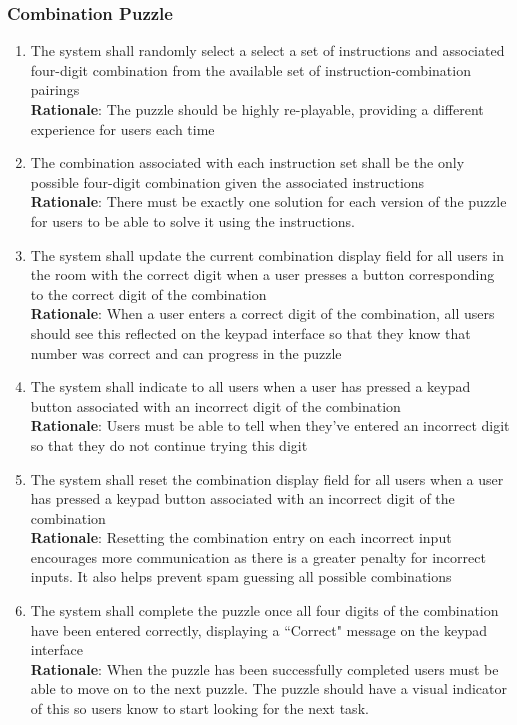 \documentclass[12pt]{article}
\begin{document}
\subsubsection{Combination Puzzle}
    \begin{enumerate}[label=CP\arabic*., series=CombinationPuzzle]
        \item The system shall randomly select a select a set of instructions and associated four-digit combination from the available set of instruction-combination pairings\\
        \textbf{Rationale}: The puzzle should be highly re-playable, providing a different experience for users each time
        \item The combination associated with each instruction set shall be the only possible four-digit combination given the associated instructions\\
        \textbf{Rationale}: There must be exactly one solution for each version of the puzzle for users to be able to solve it using the instructions.
        \item The system shall update the current combination display field for all users in the room with the correct digit when a user presses a button corresponding to the correct digit of the combination\\
        \textbf{Rationale}: When a user enters a correct digit of the combination, all users should see this reflected on the keypad interface so that they know that number was correct and can progress in the puzzle
        \item The system shall indicate to all users when a user has pressed a keypad button associated with an incorrect digit of the combination\\
        \textbf{Rationale}: Users must be able to tell when they've entered an incorrect digit so that they do not continue trying this digit 
        \item The system shall reset the combination display field for all users when a user has pressed a keypad button associated with an incorrect digit of the combination\\
        \textbf{Rationale}: Resetting the combination entry on each incorrect input encourages more communication as there is a greater penalty for incorrect inputs. It also helps prevent spam guessing all possible combinations
        \item The system shall complete the puzzle once all four digits of the combination have been entered correctly, displaying a ``Correct" message on the keypad interface\\
        \textbf{Rationale}: When the puzzle has been successfully completed users must be able to move on to the next puzzle. The puzzle should have a visual indicator of this so users know to start looking for the next task.
    \end{enumerate}
\end{document}

